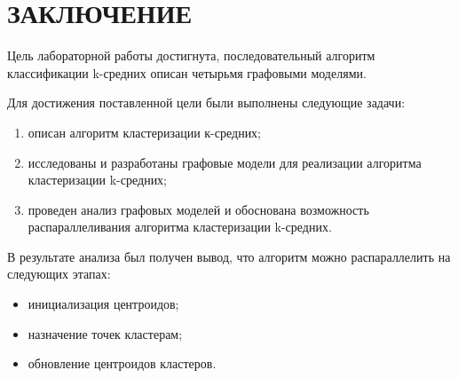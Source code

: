 \chapter*{ЗАКЛЮЧЕНИЕ}

Цель лабораторной работы достигнута, последовательный алгоритм классификации k-средних описан четырьмя графовыми моделями.

Для достижения поставленной цели были выполнены следующие задачи:
\begin{enumerate}
	\item описан алгоритм кластеризации к-средних;
	\item исследованы и разработаны графовые модели для реализации алгоритма кластеризации k-средних;
	\item проведен анализ графовых моделей и обоснована возможность \guillemotleft распараллеливания\guillemotright{} алгоритма кластеризации k-средних.
\end{enumerate}

В результате анализа был получен вывод, что алгоритм можно распараллелить на следующих этапах:

\begin{itemize}
	\item инициализация центроидов;
	\item назначение точек кластерам;
	\item обновление центроидов кластеров.
\end{itemize}